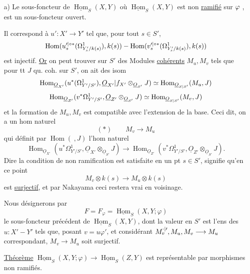 a) Le sous-foncteur de $\underline{\operatorname{Hom}}_S(X,Y)$ où $\underline{\operatorname{Hom}}_S(X,Y)$ est non \uline{ramifié} sur $\varphi$ , est un sous-foncteur ouvert.

Il correspond à $u':X'\longrightarrow Y'$ tel que, pour tout $s\in S'$,
\[
\operatorname{Hom}(u_s^{\prime|\circ*}(\Omega^1_{Y'_s/k(s)}),k(s))-\operatorname{Hom}(v_s^{\prime|\circ*}(\Omega^1_{Y'_s/k(s)}),k(s))
\]
est injectif. \uline{Or} on peut trouver sur $S'$ des Modules \uline{cohérents} $M_u,M_v$ tels que pour tt $J$ qu. coh. sur $S'$, on ait des isom 
\[
\operatorname{Hom}_{\underline{O}_{X'}}(u^*(\Omega^1_{Y'/S'}),\underline{O}_{X'}|f_{X'}\otimes_{\underline{O}_{S'}}J)\simeq\operatorname{Hom}_{\underline{O}_{S|S'}}(M_u,J)
\]
\[
\operatorname{Hom}_{\underline{O}_{Z'}}(v^*\Omega^1_{Y'/S'},\underline{O}_{Z'}\otimes_{\underline{O}_{S'}}J)\simeq\operatorname{Hom}_{\underline{O}_{S|S'}}(M_v,J)
\]
et la formation de $M_u,M_v$ est compatible avec l'extension de la base. Ceci dit, on a un hom naturel
\[
(*)\qquad M_v\longrightarrow M_u
\]
qui définit par $\operatorname{Hom}(\ ,J)$ l'hom naturel
\[
\operatorname{Hom}_{\underline{O}_{X'}}(u^*\Omega^1_{Y'/S'},\underline{O}_{X'}\otimes_{\underline{O}_{S'}}J)\longrightarrow\operatorname{Hom}_{\underline{O}_{Z'}}(v^*\Omega^1_{Y'/S'},\underline{O}_{Z'}\otimes_{\underline{O}_{S'}}J).
\]
Dire   la condition de non ramification est satisfaite en un pt $s\in S'$, signifie qu'en ce point
\[
M_v\otimes k(s)\longrightarrow M_u\otimes k(s)
\]
est \uline{surjectif}, et par Nakayama ceci restera vrai en
voisinage.

Nous désignerons par
\[
F=F_\varphi=\underline{\operatorname{Hom}}_S(X,Y;\varphi)
\]
le sous-foncteur précédent de $\underline{\operatorname{Hom}}_S(X,Y)$, dont la valeur en $S'$ est l'ens des  $u:X'-Y'$ tels que, posant $v=u\varphi'$, et considérant $M_v^{\cdot|\prime},M_u,M_v\longrightarrow M_u$ correspondant, $M_v\longrightarrow M_u$ soit surjectif.

\uline{Théorème} $\underline{\operatorname{Hom}}_S(X,Y;\varphi)\longrightarrow\underline{\operatorname{Hom}}_S(Z,Y)$ est représentable par morphismes non ramifiés.

